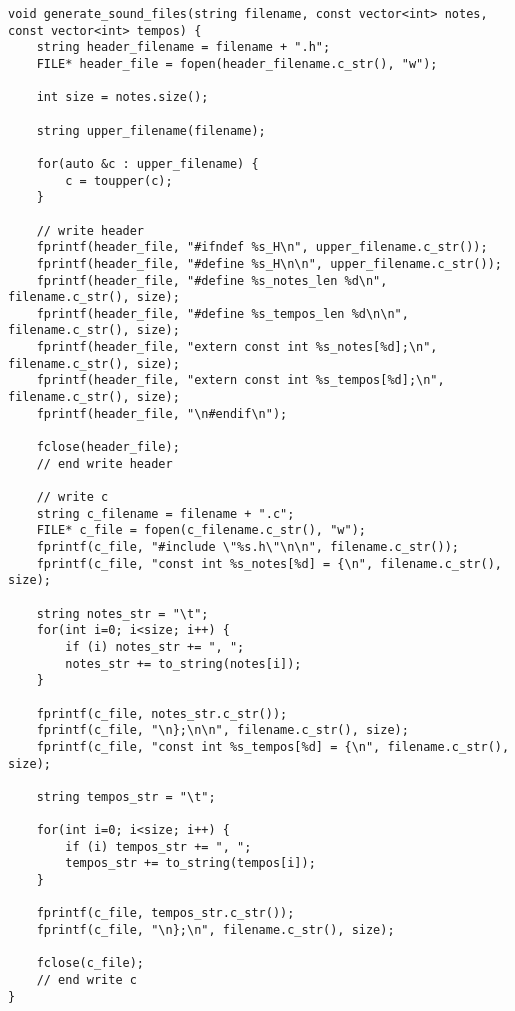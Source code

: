 \begin{lstlisting}[caption={\textit{Parser} incrementado para geração das notas e tempos},label={lst:parserinc}]
void generate_sound_files(string filename, const vector<int> notes, const vector<int> tempos) {
    string header_filename = filename + ".h";
    FILE* header_file = fopen(header_filename.c_str(), "w");

    int size = notes.size();

    string upper_filename(filename);

    for(auto &c : upper_filename) {
        c = toupper(c);
    }

    // write header
    fprintf(header_file, "#ifndef %s_H\n", upper_filename.c_str());
    fprintf(header_file, "#define %s_H\n\n", upper_filename.c_str());
    fprintf(header_file, "#define %s_notes_len %d\n", filename.c_str(), size);
    fprintf(header_file, "#define %s_tempos_len %d\n\n", filename.c_str(), size);
    fprintf(header_file, "extern const int %s_notes[%d];\n", filename.c_str(), size);
    fprintf(header_file, "extern const int %s_tempos[%d];\n", filename.c_str(), size);
    fprintf(header_file, "\n#endif\n");

    fclose(header_file);
    // end write header

    // write c
    string c_filename = filename + ".c";
    FILE* c_file = fopen(c_filename.c_str(), "w");
    fprintf(c_file, "#include \"%s.h\"\n\n", filename.c_str());
    fprintf(c_file, "const int %s_notes[%d] = {\n", filename.c_str(), size);

    string notes_str = "\t";
    for(int i=0; i<size; i++) {
        if (i) notes_str += ", ";
        notes_str += to_string(notes[i]);
    }

    fprintf(c_file, notes_str.c_str());
    fprintf(c_file, "\n};\n\n", filename.c_str(), size);
    fprintf(c_file, "const int %s_tempos[%d] = {\n", filename.c_str(), size);

    string tempos_str = "\t";

    for(int i=0; i<size; i++) {
        if (i) tempos_str += ", ";
        tempos_str += to_string(tempos[i]);
    }

    fprintf(c_file, tempos_str.c_str());
    fprintf(c_file, "\n};\n", filename.c_str(), size);

    fclose(c_file);
    // end write c
}
\end{lstlisting}

